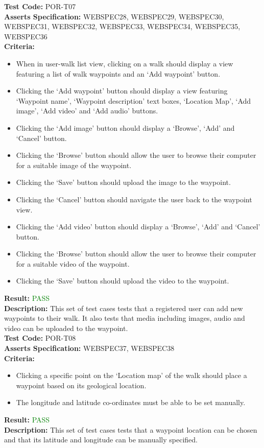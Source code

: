 \documentclass[11pt,a4paper]{report}
\begin{document}
\label{test:POR-T07}
\noindent\textbf{Test Code:} POR-T07\\
\textbf{Asserts Specification:} WEBSPEC28, WEBSPEC29, WEBSPEC30, WEBSPEC31, WEBSPEC32, WEBSPEC33, WEBSPEC34, WEBSPEC35, WEBSPEC36\\ 
\textbf{Criteria:} \begin{itemize}
                     \item When in user-walk list view, clicking on a walk should display a view featuring a list of walk waypoints and an `Add waypoint' button.
                     \item Clicking the `Add waypoint' button should display a view featuring `Waypoint name', `Waypoint description' text boxes, `Location Map', `Add image', `Add video' and `Add audio' buttons.
                     \item Clicking the `Add image' button should display a `Browse', `Add' and `Cancel' button.
                     \item Clicking the `Browse' button should allow the user to browse their computer for a suitable image of the waypoint.
                     \item Clicking the `Save' button should upload the image to the waypoint.
                     \item Clicking the `Cancel' button should navigate the user back to the waypoint view.
                     \item Clicking the `Add video' button should display a `Browse', `Add' and `Cancel' button.
                     \item Clicking the `Browse' button should allow the user to browse their computer for a suitable video of the waypoint.
                     \item Clicking the `Save' button should upload the video to the waypoint.
                   \end{itemize}  
\textbf{Result:} \textcolor{green}{PASS}\\ 
\textbf{Description:} This set of test cases tests that a registered user can add new waypoints to their walk. It also tests that media including images, audio and video can be uploaded to the waypoint. \\

\label{test:POR-T08}
\noindent\textbf{Test Code:} POR-T08\\
\textbf{Asserts Specification:} WEBSPEC37, WEBSPEC38\\ 
\textbf{Criteria:} \begin{itemize}
                     \item Clicking a specific point on the `Location map' of the walk should place a waypoint based on its geological location.
                     \item The longitude and latitude co-ordinates must be able to be set manually.
                   \end{itemize}  
\textbf{Result:} \textcolor{green}{PASS}\\
\textbf{Description:} This set of test cases tests that a waypoint location can be chosen and that its latitude and longitude can be manually specified. \\
\end{document}
